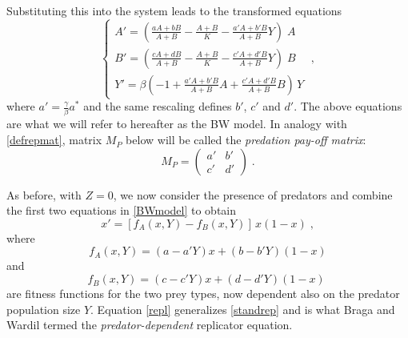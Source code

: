 \documentclass[12pt]{article}
\theoremstyle{definition}
\begin{document}
Substituting this into the system leads to the transformed equations
\begin{equation} \label{BWmodel}
	\begin{cases} 
		A' =  \left( \frac{aA + bB}{A + B} - \frac{A + B}{K} - \frac{a'A + b'B}{A + B}Y \right)\;A \\
		B' =  \left( \frac{cA + dB}{A + B} - \frac{A + B}{K} - \frac{c'A + d'B}{A + B}Y \right)\;B \\
		Y' = \beta \left( -1 +\frac{a'A + b'B}{A + B}A + \frac{c'A + d'B}{A + B}B \right) \,Y
	\end{cases}\;, 
\end{equation}
where $a'=\frac{\gamma}{\beta}a^*$ and the same rescaling defines $b'$, $c'$ and $d'$. The above equations are what we will refer to hereafter as the BW model. In analogy with \eqref{defrepmat}, matrix $M_P$ below will be called the \emph{predation pay-off matrix}:
\begin{equation}  \label{defpredmat}
	M_P=\begin{pmatrix}
		a' & b' \\
		c' & d'
	\end{pmatrix}\;.
\end{equation}

As before, with $Z=0$, we now consider the presence of predators and combine the first two equations in \eqref{BWmodel} to obtain
\begin{equation}  \label{repl}
	x'= [f_A(x,Y)-f_B(x,Y)] \, x(1-x)\;,
\end{equation}
where 
\begin{equation} \label{A fit}
	f_A(x,Y) = (a-a'Y)x+(b-b'Y)(1-x)
\end{equation}
and  
\begin{equation} \label{B fit}
	f_B(x,Y) = (c-c'Y)x+(d-d'Y)(1-x)\;
\end{equation}
are fitness functions for the two prey types, now dependent also on the predator population size $Y$. Equation \eqref{repl} generalizes \eqref{standrep} and is what Braga and Wardil termed the \emph{predator-dependent} replicator equation.
\end{document}
